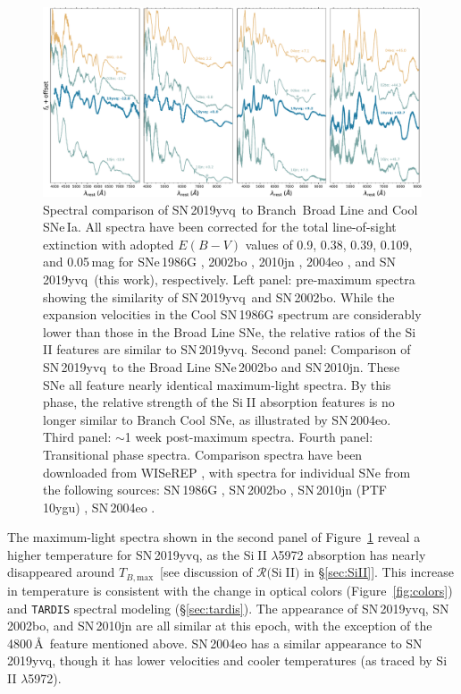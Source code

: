 \documentclass[twocolumn]{aastex63}
\def\ion#1#2{#1$\;${\footnotesize\rm{#2}}\relax}
\newcommand{\tbmax}{$T_{B,\mathrm{max}}$}
\newcommand{\sn}{SN\,2019yvq}
\begin{document}
\begin{figure}
    \centering
    \includegraphics[width=\textwidth]{./figures/spec_comp_extinction.pdf}
    \caption{Spectral comparison of \sn\ to Branch~Broad Line and Cool
    SNe\,Ia. All spectra have been corrected for the total line-of-sight
    extinction with adopted $E(B-V)$ values of 0.9, 0.38, 0.39, 0.109, and
    0.05\,mag for SNe\,1986G \citep{Phillips87}, 2002bo \citep{Stehle05},
    2010jn \citep{Hachinger13}, 2004eo \citep{Pastorello07}, and \sn\ (this
    work), respectively. Left panel: pre-maximum spectra showing the
    similarity of \sn\ and SN\,2002bo. While the expansion velocities in the
    Cool SN\,1986G spectrum are considerably lower than those in the Broad
    Line SNe, the relative ratios of the \ion{Si}{II} features are similar to
    \sn. Second panel: Comparison of \sn\ to the Broad Line SNe\,2002bo and
    SN\,2010jn. These SNe all feature nearly identical maximum-light spectra.
    By this phase, the relative strength of the \ion{Si}{II} absorption
    features is no longer similar to Branch Cool SNe, as illustrated by
    SN\,2004eo. Third panel: $\sim$1 week post-maximum spectra. Fourth panel:
    Transitional phase spectra. Comparison spectra have been downloaded from
    WISeREP \citep{Yaron12}, with spectra for individual SNe from the
    following sources: SN\,1986G \citep{Cristiani92}, SN\,2002bo
    \citep{Benetti04,Silverman11}, SN\,2010jn (PTF\,10ygu)
    \citep{Hachinger13,Maguire14}, SN\,2004eo \citep{Pastorello07}.}
    \label{fig:spec_comp}
\end{figure}

The maximum-light spectra shown in the second panel of
Figure~\ref{fig:spec_comp} reveal a higher temperature for \sn, as the
\ion{Si}{II} $\lambda$5972 absorption has nearly disappeared around \tbmax\
[see discussion of $\mathcal{R}($\ion{Si}{II}$)$ in \S\ref{sec:SiII}]. This
increase in temperature is consistent with the change in optical colors
(Figure~\ref{fig:colors}) and \texttt{TARDIS} spectral modeling
(\S\ref{sec:tardis}). The appearance of \sn, SN\,2002bo, and SN\,2010jn are
all similar at this epoch, with the exception of the 4800\,\AA\ feature
mentioned above. SN\,2004eo has a similar appearance to \sn, though it has
lower velocities and cooler temperatures (as traced by \ion{Si}{II}
$\lambda$5972).
\end{document}
